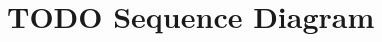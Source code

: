 \begin{table}[H]
\begin{tabular}{p{0.27\linewidth}  p{0.67\linewidth}}
\end{tabular}
\end{table}


\newpage
\section{TODO Sequence Diagram}

